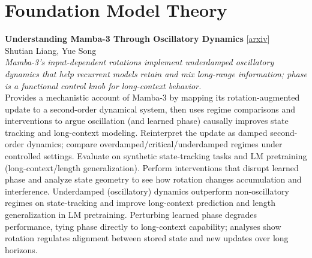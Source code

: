 \documentclass[12pt,letterpaper]{article}
\begin{document}
\medskip


\section*{Foundation Model Theory}

{\small\textbf{Understanding Mamba-3 Through Oscillatory Dynamics}} {\scriptsize[\href{https://arxiv.org/abs/2610.13341}{arxiv}]}\\
{\scriptsize Shutian Liang, Yue Song}\\

{\small\textit{Mamba-3's input-dependent rotations implement underdamped oscillatory dynamics that help recurrent models retain and mix long-range information; phase is a functional control knob for long-context behavior.}}\\[1pt]
{\footnotesize Provides a mechanistic account of Mamba-3 by mapping its rotation-augmented update to a second-order dynamical system, then uses regime comparisons and interventions to argue oscillation (and learned phase) causally improves state tracking and long-context modeling. Reinterpret the update as damped second-order dynamics; compare overdamped/critical/underdamped regimes under controlled settings. Evaluate on synthetic state-tracking tasks and LM pretraining (long-context/length generalization). Perform interventions that disrupt learned phase and analyze state geometry to see how rotation changes accumulation and interference. Underdamped (oscillatory) dynamics outperform non-oscillatory regimes on state-tracking and improve long-context prediction and length generalization in LM pretraining. Perturbing learned phase degrades performance, tying phase directly to long-context capability; analyses show rotation regulates alignment between stored state and new updates over long horizons.}

\medskip
\end{document}
